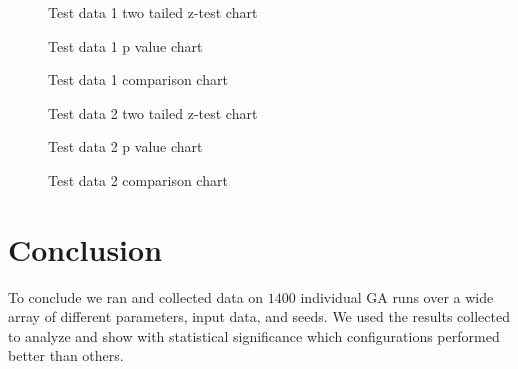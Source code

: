 \documentclass[conference]{IEEEtran}
\begin{document}
\begin{figure*}[ht]
\centering
\begin{adjustbox}{max width=\textwidth}

\end{adjustbox}
\caption{Test data 1 two tailed z-test chart}
\label{fig:td1_zvalues}
\end{figure*}

\begin{figure*}[ht]
\centering
\begin{adjustbox}{max width=\textwidth}

\end{adjustbox}
\caption{Test data 1 p value chart}
\label{fig:td1_pvalues}
\end{figure*}

\begin{figure*}[ht]
\centering
\begin{adjustbox}{max width=\textwidth}

\end{adjustbox}
\caption{Test data 1 comparison chart}
\label{fig:td1_compare}
\end{figure*}
\clearpage
\pagebreak
\begin{figure*}[ht]
\centering
\begin{adjustbox}{max width=\textwidth}

\end{adjustbox}
\caption{Test data 2 two tailed z-test chart}
\label{fig:td2_zvalues}
\end{figure*}

\begin{figure*}[ht]
\centering
\begin{adjustbox}{max width=\textwidth}

\end{adjustbox}
\caption{Test data 2 p value chart}
\label{fig:td2_pvalues}
\end{figure*}

\begin{figure*}[ht]
\centering
\begin{adjustbox}{max width=\textwidth}

\end{adjustbox}
\caption{Test data 2 comparison chart}
\label{fig:td2_compare}
\end{figure*}
\clearpage
\pagebreak

\section{Conclusion}
To conclude we ran and collected data on $1400$ individual GA runs over a wide array of different parameters, input data, and seeds. We used the results collected to analyze and show with statistical significance which configurations performed better than others. \\
\end{document}
